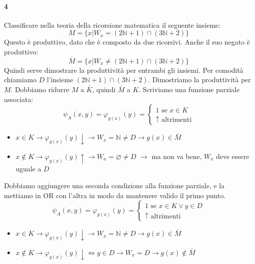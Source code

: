 \documentclass[a4paper,oneside]{scrbook}
\begin{document}
\paragraph{4} Classificare nella teoria della ricorsione matematica il seguente insieme:
\begin{equation*}
	M=\{x|W_x=(2\mathbb{N}+1)\cap(3\mathbb{N}+2)\}
\end{equation*}
Questo è produttivo, dato che è composto da due ricorsivi. Anche il suo negato è produttivo:
\begin{equation*}
	\bar{M}=\{x|W_x\ne(2\mathbb{N}+1)\cap(3\mathbb{N}+2)\}
\end{equation*}
Quindi serve dimostrare la produttività per entrambi gli insiemi. Per comodità chiamiamo $D$ l'insieme $(2\mathbb{N}+1)\cap(3\mathbb{N}+2)$.
Dimostriamo la produttività per $M$. Dobbiamo ridurre $M$ a $\bar{K}$, quindi $\bar{M}$ a $K$.
Scriviamo una funzione parziale associata:
\begin{equation*}
	\psi_A(x,y)=
	\varphi_{g(x)}(y)=
	\begin{cases}
		1 \text{ se } x \in K\\
		\uparrow \text{ altrimenti}
	\end{cases}
\end{equation*}
\begin{itemize}
	\item $x\in K \rightarrow \varphi_{g(x)}(y)\downarrow \rightarrow W_x=\mathbb{N} \ne D \rightarrow g(x)\in\bar{M}$
	\item $x\notin K \rightarrow \varphi_{g(x)}(y)\uparrow \rightarrow W_x=\varnothing \ne D$ $\rightarrow$ ma non va bene, $W_x$ deve essere uguale a $D$
\end{itemize}
Dobbiamo aggiungere una seconda condizione alla funzione parziale, e la mettiamo in OR con l'altra in modo da mantenere valido il primo punto.
\begin{equation*}
	\psi_A(x,y)=
	\varphi_{g(x)}(y)=
	\begin{cases}
		1 \text{ se } x \in K \vee y \in D\\
		\uparrow \text{ altrimenti}
	\end{cases}
\end{equation*}
\begin{itemize}
	\item $x\in K \rightarrow \varphi_{g(x)}(y)\downarrow \rightarrow W_x=\mathbb{N} \ne D \rightarrow g(x)\in\bar{M}$
	\item $x\notin K \rightarrow \varphi_{g(x)}(y)\downarrow \iff y\in D \rightarrow W_x=D \rightarrow g(x)\notin \bar{M}$
\end{itemize}
\end{document}
